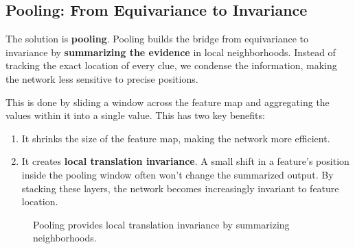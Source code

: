 \documentclass{article}
\begin{document}
\subsection{Pooling: From Equivariance to Invariance}
The solution is \textbf{pooling}. Pooling builds the bridge from equivariance to invariance by \textbf{summarizing the evidence} in local neighborhoods. Instead of tracking the exact location of every clue, we condense the information, making the network less sensitive to precise positions.

This is done by sliding a window across the feature map and aggregating the values within it into a single value. This has two key benefits:
\begin{enumerate}
    \item It shrinks the size of the feature map, making the network more efficient.
    \item It creates \textbf{local translation invariance}. A small shift in a feature's position inside the pooling window often won't change the summarized output. By stacking these layers, the network becomes increasingly invariant to feature location.
\end{enumerate}

\begin{figure}[h]
\centering
{}
\caption{Pooling provides local translation invariance by summarizing neighborhoods.}
\end{figure}
\end{document}
